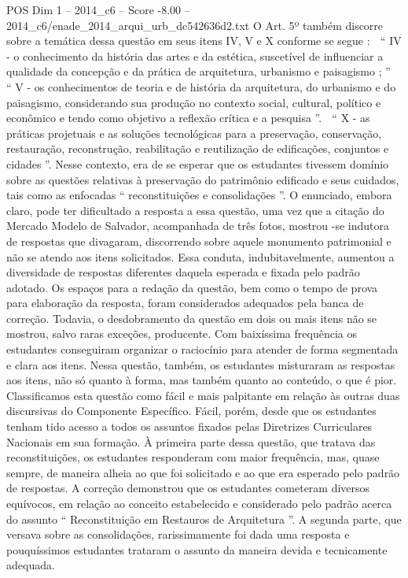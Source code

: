 \begin{textsample}{POS Dim 1 – 2014\_c6 – Score -8.00 – 2014\_c6/enade\_2014\_arqui\_urb\_dc542636d2.txt}
O Art. 5º também discorre sobre a temática dessa questão em seus itens IV, V e X conforme se segue :  “ IV - o conhecimento da história das artes e da estética, suscetível de influenciar a qualidade da concepção e da prática de arquitetura, urbanismo e paisagismo ; ”  “ V - os conhecimentos de teoria e de história da arquitetura, do urbanismo e do paisagismo, considerando sua produção no contexto social, cultural, político e econômico e tendo como objetivo a reflexão crítica e a pesquisa ”.  “ X - as práticas projetuais e as soluções tecnológicas para a preservação, conservação, restauração, reconstrução, reabilitação e reutilização de edificações, conjuntos e cidades ”.
Nesse contexto, era de se esperar que os estudantes tivessem domínio sobre as questões relativas à preservação do patrimônio edificado e seus cuidados, tais como as enfocadas “ reconstituições e consolidações ”.
O enunciado, embora claro, pode ter dificultado a resposta a essa questão, uma vez que a citação do Mercado Modelo de Salvador, acompanhada de três fotos, mostrou -se indutora de respostas que divagaram, discorrendo sobre aquele monumento patrimonial e não se atendo aos itens solicitados.
Essa conduta, indubitavelmente, aumentou a diversidade de respostas diferentes daquela esperada e fixada pelo padrão adotado.
Os espaços para a redação da questão, bem como o tempo de prova para elaboração da resposta, foram considerados adequados pela banca de correção.
Todavia, o desdobramento da questão em dois ou mais itens não se mostrou, salvo raras exceções, producente.
Com baixíssima frequência os estudantes conseguiram organizar o raciocínio para atender de forma segmentada e clara aos itens.
Nessa questão, também, os estudantes misturaram as respostas aos itens, não só quanto à forma, mas também quanto ao conteúdo, o que é pior.
Classificamos esta questão como fácil e mais palpitante em relação às outras duas discursivas do Componente Específico.
Fácil, porém, desde que os estudantes tenham tido acesso a todos os assuntos fixados pelas Diretrizes Curriculares Nacionais em sua formação.
À primeira parte dessa questão, que tratava das reconstituições, os estudantes responderam com maior frequência, mas, quase sempre, de maneira alheia ao que foi solicitado e ao que era esperado pelo padrão de respostas.
A correção demonstrou que os estudantes cometeram diversos equívocos, em relação ao conceito estabelecido e considerado pelo padrão acerca do assunto “ Reconstituição em Restauros de Arquitetura ”.
A segunda parte, que versava sobre as consolidações, rarissimamente foi dada uma resposta e pouquíssimos estudantes trataram o assunto da maneira devida e tecnicamente adequada.

\end{textsample}
